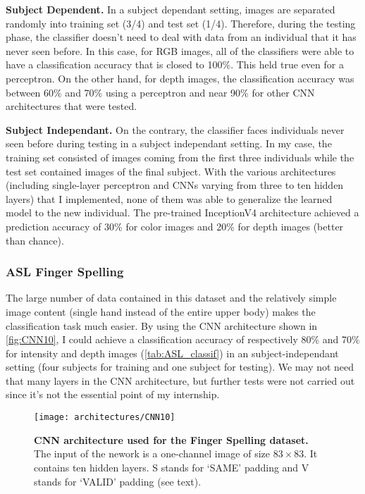 \textbf{Subject Dependent.}
In a subject dependant setting, images are separated randomly into
training set (3/4) and test set (1/4). Therefore, during the
testing phase, the classifier doesn't need to deal with data from an
individual that it has never seen before.
In this case, for RGB images, all of the classifiers were able to
have a classification accuracy that is closed to 100\%. This held true
even for a perceptron.
On the other hand, for depth images, the classification accuracy was
between 60\% and 70\% using a perceptron and near 90\% for other CNN
architectures that were tested.

\textbf{Subject Independant.}
On the contrary, the classifier faces individuals never seen before
during testing in a subject independant setting. 
In my case, the training set consisted of images coming from the
first three individuals while the test set contained images of
the final subject.
With the various architectures (including single-layer perceptron
and CNNs varying from three to ten hidden layers)
that I implemented, none of them was able to generalize the learned model
to the new individual.
The pre-trained InceptionV4 architecture \cite{C. Szegedy 2017}
achieved a prediction accuracy
of 30\% for color images and 20\% for depth images (better than chance).

\subsubsection{ASL Finger Spelling} \label{subsubsection:ASL_CNN}

The large number of data contained in this dataset and the relatively
simple image content (single hand instead of the entire upper body)
makes the classification task much easier. By using the CNN architecture
shown in \autoref{fig:CNN10}, I could achieve a classification accuracy
of respectively 80\% and 70\% for intensity and depth images
(\autoref{tab:ASL_classif})
in an subject-independant setting (four subjects for training and one
subject for testing). We may not need that many layers in the CNN
architecture, but further tests were not carried out since it's not
the essential point of my internship.

\begin{figure}[H]
  \centering
  \texttt{[image: architectures/CNN10]}
  \caption{%
    \textbf{CNN architecture used for the Finger Spelling  dataset.}
      \\[0.1em]
    The input of the nework is a one-channel image of size $83 \times 83$.
      It contains ten hidden layers. S stands for `SAME' padding
      and V stands for `VALID' padding (see text).}
  \label{fig:CNN10}
\end{figure}

